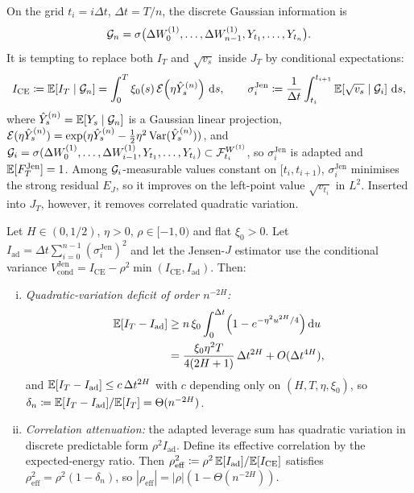 On the grid $t_i=i\Delta t$, $\Delta t=T/n$, the discrete Gaussian information is
\[
  \mathcal{G}_n=\sigma\bigl(\Delta W_0^{(1)},\dots,\Delta W_{n-1}^{(1)},Y_{t_1},\dots,Y_{t_n}\bigr).
\]
It is tempting to replace both $I_T$ and $\sqrt{v_s}$ inside $J_T$ by conditional expectations:
\begin{equation}
  \begin{gathered}
  I_{\mathrm{CE}} \coloneqq \mathbb{E}[I_T\mid\mathcal{G}_n] = \int_0^T \xi_0(s)\,\mathcal{E}\!\left(\eta\hat{Y}_s^{(n)}\right)\,\mathrm{d} s,
  \qquad
  \sigma_i^{\mathrm{Jen}} \coloneqq \frac{1}{\Delta t}\int_{t_i}^{t_{i+1}} \mathbb{E}\!\left[\sqrt{v_s}\mid\mathcal{G}_i\right]\,\mathrm{d} s,
  \end{gathered}
  \label{eq:ce_defs}
\end{equation}
where $\hat{Y}_s^{(n)}=\mathbb{E}[Y_s\mid\mathcal{G}_n]$ is a Gaussian linear projection, $\mathcal{E}(\eta\hat{Y}_s^{(n)})=\exp(\eta\hat{Y}_s^{(n)}-\tfrac12\eta^2\operatorname{Var}(\hat{Y}_s^{(n)}))$, and $\mathcal{G}_i=\sigma(\Delta W_0^{(1)},\dots,\Delta W_{i-1}^{(1)},Y_{t_1},\dots,Y_{t_i})\subset\mathcal{F}_{t_i}^{W^{(1)}}$, so $\sigma_i^{\mathrm{Jen}}$ is adapted and $\mathbb{E}[F_T^{\mathrm{Jen}}]=1$. Among $\mathcal{G}_i$-measurable values constant on $[t_i,t_{i+1})$, $\sigma_i^{\mathrm{Jen}}$ minimises the strong residual $E_J$, so it improves on the left-point value $\sqrt{v_{t_i}}$ in $L^2$. Inserted into $J_T$, however, it removes correlated quadratic variation.

\begin{proposition}
\label{prop:jensen_pitfall}
Let $H\in(0,1/2)$, $\eta>0$, $\rho\in[-1,0)$ and flat $\xi_0>0$. Let $I_{\mathrm{ad}}=\Delta t\sum_{i=0}^{n-1}(\sigma_i^{\mathrm{Jen}})^2$ and let the Jensen-$J$ estimator use the conditional variance $V_{\mathrm{cond}}^{\mathrm{Jen}}=I_{\mathrm{CE}}-\rho^2\min(I_{\mathrm{CE}},I_{\mathrm{ad}})$. Then:
\begin{enumerate}[(i)]
  \item \emph{Quadratic-variation deficit of order $n^{-2H}$:}
  \begin{equation}
    \begin{aligned}
      \mathbb{E}[I_T - I_{\mathrm{ad}}]
      &\ge n\,\xi_0 \int_0^{\Delta t}\Bigl(1 - e^{-\eta^2u^{2H}/4}\Bigr)\,\mathrm{d} u \\
      &= \frac{\xi_0\eta^2 T}{4(2H+1)}\,\Delta t^{2H} + O(\Delta t^{4H}),
    \end{aligned}
    \label{eq:jensen_deficit}
  \end{equation}
  and $\mathbb{E}[I_T-I_{\mathrm{ad}}]\le c\,\Delta t^{2H}$ with $c$ depending only on $(H,T,\eta,\xi_0)$, so $\delta_n\coloneqq\mathbb{E}[I_T-I_{\mathrm{ad}}]/\mathbb{E}[I_T]=\Theta(n^{-2H})$.
  \item \emph{Correlation attenuation:} the adapted leverage sum has quadratic variation in discrete predictable form $\rho^2 I_{\mathrm{ad}}$. Define its effective correlation by the expected-energy ratio. Then $\rho_{\mathrm{eff}}^2\coloneqq\rho^2\,\mathbb{E}[I_{\mathrm{ad}}]/\mathbb{E}[I_{\mathrm{CE}}]$ satisfies $\rho_{\mathrm{eff}}^2=\rho^2(1-\delta_n)$, so $|\rho_{\mathrm{eff}}|=|\rho|(1-\Theta(n^{-2H}))$.
\end{enumerate}
\end{proposition}

